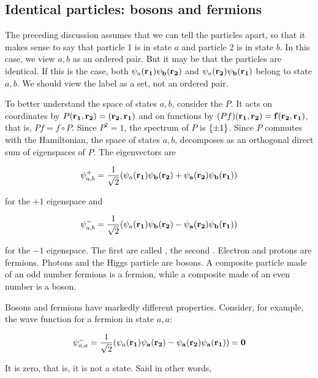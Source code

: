 \subsection{Identical particles: bosons and fermions}

The preceding discussion assumes that we can tell the particles apart, so that it makes sense to say that particle 1 is in state $a$ and particle 2 is in state $b$.  In this case, we view $a, b$ as an ordered pair.  But it may be that the particles are identical.  If this is the case, both $\psi_a(\bf{r}_1)\psi_b(\bf{r}_2)$ and $\psi_a(\bf{r}_2)\psi_b(\bf{r}_1)$ belong to state $a, b$.  We should view the label as a set, not an ordered pair.

To better understand the space of states $a, b$, consider the  $P$. It acts on coordinates by $P(\bf{r}_1, \bf{r}_2) = (\bf{r}_2, \bf{r}_1)$ and on functions by $(Pf)(\bf{r}_1, \bf{r}_2) = f(\bf{r}_2,\bf{r}_1)$, that is, $Pf = f\circ P$.  Since $P^2 = 1$, the spectrum of $P$ is $\{\pm1\}$. Since $P$ commutes with the Hamiltonian, the space of states $a, b$, decomposes as an orthogonal direct sum of eigenspaces of $P$.  The eigenvectors are

\begin{equation}
\label{boson}
\psi^+_{a,b}  = \frac{1}{\sqrt 2}(\psi_a(\bf{r}_1)\psi_b(\bf{r}_2) + \psi_a(\bf{r}_2)\psi_b(\bf{r}_1))
\end{equation}

for the $+1$ eigenspace and

\begin{equation}
\label{fermion}
\psi^-_{a,b}  = \frac{1}{\sqrt 2}(\psi_a(\bf{r}_1)\psi_b(\bf{r}_2) - \psi_a(\bf{r}_2)\psi_b(\bf{r}_1))
\end{equation}

for the $-1$ eigenspace.  The first are called , the second .  Electron and protons are fermions. Photons and the Higgs particle are bosons.  A composite particle made of an odd number fermions is a fermion, while a composite made of an even number is a boson.

Bosons and fermions have markedly different properties.  Consider, for example, the wave function for a fermion in state $a, a$:

\begin{equation}
\psi^-_{a,a}  = \frac{1}{\sqrt 2}(\psi_a(\bf{r}_1)\psi_a(\bf{r}_2) - \psi_a(\bf{r}_2)\psi_a(\bf{r}_1)) = 0
\end{equation}

It is zero, that is, it is not a state.  Said in other words,

